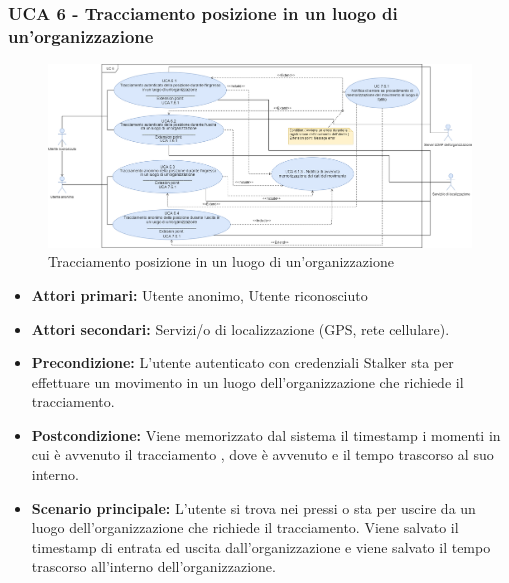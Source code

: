 \subsubsection{UCA 6 - Tracciamento posizione in un luogo di un'organizzazione}%

\begin{figure}[h]
	\centering
	\includegraphics[scale=0.3]{sezioni/UseCase/Immagini/UCA6.png}
	\caption{Tracciamento posizione in un luogo di un'organizzazione}
\end{figure}

\begin{itemize}
	\item \textbf{Attori primari:} Utente anonimo, Utente riconosciuto
	\item \textbf{Attori secondari:} Servizi/o di localizzazione (GPS, rete cellulare).
	\item \textbf{Precondizione:} L'utente autenticato con credenziali Stalker sta per effettuare un movimento in un luogo dell'organizzazione che richiede il tracciamento.
	\item \textbf{Postcondizione:} Viene memorizzato dal sistema il timestamp i momenti in cui è avvenuto il tracciamento , dove è avvenuto e il tempo trascorso al suo interno.
	\item \textbf{Scenario principale:} L'utente si trova nei pressi o sta per uscire da un luogo dell'organizzazione che richiede il tracciamento. Viene salvato il timestamp di entrata ed uscita dall'organizzazione e viene salvato il tempo trascorso all'interno dell'organizzazione.
\end{itemize}

